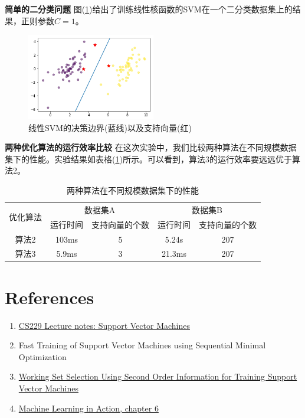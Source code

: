 \documentclass[11pt]{article}
\begin{document}
\textbf{简单的二分类问题 }图(\ref{exp:1})给出了训练线性核函数的SVM在一个二分类数据集上的结果，正则参数$C=1$。
\begin{figure}
\centering
\includegraphics[width=0.5\textwidth]{images/img16.png}
\caption{线性SVM的决策边界(蓝线)以及支持向量(红)}
\label{exp:1}
\end{figure}

\textbf{两种优化算法的运行效率比较 }在这次实验中，我们比较两种算法在不同规模数据集下的性能。实验结果如表格(\ref{exp:2})所示。可以看到，算法3的运行效率要远远优于算法2。
\begin{table}
\caption{两种算法在不同规模数据集下的性能}
\label{exp:2}
\centering
\begin{tabular}{c|cc|cc}
\hline
\multirow{2}{4em}{优化算法} & \multicolumn{2}{c|}{数据集A} & \multicolumn{2}{c}{数据集B} \\ 
& 运行时间 & 支持向量的个数 & 运行时间 & 支持向量的个数  \\ 
\hline
算法2 & 103ms & 5 & 5.24s &207\\
算法3 & 5.9ms & 3 & 21.3ms & 207\\
\hline
\end{tabular}
\end{table}
\pagebreak
\section{References}
\begin{enumerate}
\item\href{http://202.116.81.74/cache/1/03/cs229.stanford.edu/f92d1f9eccf4dde766e9eba3f8231233/cs229-notes3.pdf}{CS229 Lecture notes: Support Vector Machines}
\item Fast Training of Support Vector Machines using Sequential Minimal Optimization
\item\href{http://www.jmlr.org/papers/volume6/fan05a/fan05a.pdf}{Working Set Selection Using Second Order Information for Training Support Vector Machines}
\item\href{http://www2.ift.ulaval.ca/~chaib/IFT-4102-7025/public_html/Fichiers/Machine_Learning_in_Action.pdf}{Machine Learning in Action, chapter 6}
\end{enumerate}
\end{document}
